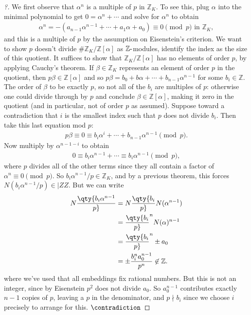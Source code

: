 \begin{proof}[?]

We first observe that \(\alpha^n\) is a multiple of \(p\) in
\({\mathbb{Z}}_K\). To see this, plug \(\alpha\) into the minimal
polynomial to get \(0 = \alpha^n + \cdots\) and solve for \(\alpha^n\)
to obtain
\begin{align*}
\alpha^n = -(a_{n-1} \alpha^{n-1} + \cdots + a_1 \alpha + a_0) \equiv 0 \pmod p \text{ in } {\mathbb{Z}}_K 
,\end{align*}
and this is a multiple of \(p\) by the assumption on Eisenstein's
criterion. We want to show \(p\) doesn't divide
\(\# {\mathbb{Z}}_K/ {\mathbb{Z}}[ \alpha]\) as
\({\mathbb{Z}}{\hbox{-}}\)modules, identify the index as the size of
this quotient. It suffices to show that
\({\mathbb{Z}}_K/{\mathbb{Z}}[ \alpha]\) has no elements of order \(p\),
by applying Cauchy's theorem. If \(\beta\in {\mathbb{Z}}_K\) represents
an element of order \(p\) in the quotient, then
\(p \beta\in {\mathbb{Z}}[ \alpha]\) and so
\(p \beta = b_0 + b \alpha + \cdots + b_{n-1} \alpha^{n-1}\) for some
\(b_i \in {\mathbb{Z}}\). The order of \(\beta\) to be exactly \(p\), so
not all of the \(b_i\) are multiples of \(p\): otherwise one could
divide through by \(p\) and conclude \(\beta\in {\mathbb{Z}}[ \alpha]\),
making it zero in the quotient (and in particular, not of order \(p\) as
assumed). Suppose toward a contradiction that \(i\) is the smallest
index such that \(p\) does not divide \(b_i\). Then take this last
equation mod \(p\):
\begin{align*}
p \beta \equiv 0 \equiv b_i \alpha^{i} + \cdots + b_{n-1} \alpha^{n-1} \pmod p
.\end{align*}
Now multiply by \(\alpha^{n-1-i}\) to obtain
\begin{align*}
0 \equiv b_i \alpha^{n-1} + \cdots \equiv b_i \alpha^{n-1} \pmod p
,\end{align*}
where \(p\) divides all of the other terms since they all contain a
factor of \(\alpha^n \equiv 0 \pmod p\). So
\(b_i \alpha^{n-1} /p \in {\mathbb{Z}}_K\), and by a previous theorem,
this forces \(N( b_i \alpha^{n-1} / p ) \in |ZZ\). But we can write
\begin{align*}
N \qty{ b_i \alpha^{n-1} \over p }
&=
N \qty{ b_i \over p} N( \alpha^{n-1} ) \\
&= \qty{b_i \over p}^{n} N( \alpha)^{n-1} \\
&= \qty{b_i \over p}^{n} \pm a_0 \\
&= \pm {b_i^n a_0^{n-1} \over p^n } \not\in {\mathbb{Z}}
.\end{align*}
where we've used that all embeddings fix rational numbers. But this is
not an integer, since by Eisenstein \(p^2\) does not divide \(a_0\). So
\(a_0^{n-1}\) contributes exactly \(n-1\) copies of \(p\), leaving a
\(p\) in the denominator, and \(p\nmid b_i\) since we choose \(i\)
precisely to arrange for this. \(\contradiction\)

\end{proof}

